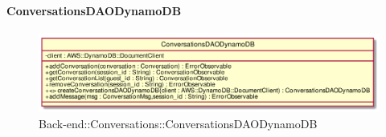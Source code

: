 \hypertarget{ConversationsDAODynamoDB_label}{\paragraph{ConversationsDAODynamoDB}}
\begin{figure}[h]
	\centering
	\includegraphics[width=\textwidth,height=\textheight,keepaspectratio]{images/ClassConversationsDAODynamoDB.png}
	\caption{Back-end::Conversations::ConversationsDAODynamoDB}
\end{figure}
